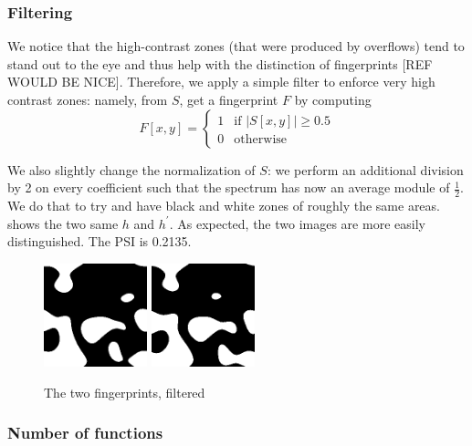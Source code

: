\documentclass{article}
\begin{document}
\subsubsection{Filtering}

We notice that the high-contrast zones (that were produced by overflows) tend to stand out to the eye and thus help with the distinction of fingerprints [REF WOULD BE NICE]. Therefore, we apply a simple filter to enforce very high contrast zones: namely, from $S$, get a fingerprint $F$ by computing
$$F[x,y] = \begin{cases}1 & \text{if }  |S[x,y]| \geq 0.5\\ 
			0 & \text{otherwise} \end{cases}$$
\begin{center}
We also slightly change the normalization of $S$: we perform an additional division by 2 on every coefficient such that the spectrum has now an average module of $\frac{1}{2}$. We do that to try and have black and white zones of roughly the same areas.
 shows the two same $h$ and $h^\prime$. As expected, the two images are more easily distinguished. The PSI is 0.2135.

\begin{figure}
    \centering
    \includegraphics[width=3cm]{figures/Filtered.png}
    \hspace{4pt}
    \includegraphics[width=3cm]{figures/FilteredP67Psi0242.png}
    \caption{The two fingerprints, filtered}
    \label{fig:oneFunc}
\end{figure}
\end{center}

\subsubsection{Number of functions}
\label{rgbSect}
\end{document}
